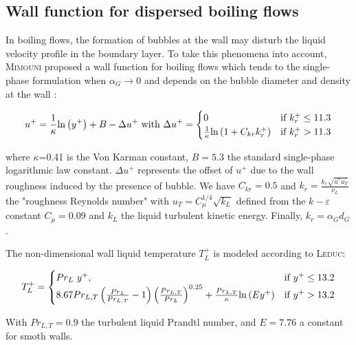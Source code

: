 \subsection{Wall function for dispersed boiling flows}
\label{subsec:wall_func}

In boiling flows, the formation of bubbles at the wall may disturb the liquid velocity profile in the boundary layer. To take this phenomena into account, \textsc{Mimouni} \etal\cite{Mimouni2016} proposed a wall function for boiling flows which tends to the single-phase formulation when $\alpha_{G} \rightarrow 0$ and depends on the bubble diameter and density at the wall : 

\begin{equation}
\label{eq:wall_law}
u^{+}=\frac{1}{\kappa}\ln{ y^{+} } + B - \Delta u^{+} \text{ with } 
  \Delta u^{+}=\begin{cases}
    0 & \text{if $k_{r}^{+}\leq11.3$}\\
    \frac{1}{\kappa}\ln{ 1+ C_{kr}k_{r}^{+} } & \text{\text{if $k_{r}^{+}>11.3$}}
  \end{cases}
\end{equation}

where $\kappa$=0.41 is the Von Karman constant, $B=5.3$ the standard single-phase logarithmic law constant. $\Delta u^{+}$ represents the offset of $u^{+}$ due to the wall roughness induced by the presence of bubble. We have $C_{kr}=0.5$ and $k_{r}=\displaystyle \frac{k_{r}\sqrt{u^{*}u_{T}}}{\nu_{L}}$ the "roughness Reynolds number" with $u_{T}=C_{\mu}^{1/4}\sqrt{k_{L}}$ defined from the $k-\varepsilon$ constant $C_{\mu}=0.09$ and $k_{L}$ the liquid turbulent kinetic energy. Finally, $k_{r}=\alpha_{G}d_{G}$.

The non-dimensional wall liquid temperature $T_{L}^{+}$ is modeled according to \textsc{Leduc}\cite{Leduc1995}:

\begin{equation}
\label{eq:wall_law} 
  T_{L}^{+}=\begin{cases}
    Pr_{L}~y^{+}, & \text{if $y^{+}\leq 13.2$}\\
    8.67Pr_{L,T}\parth{ \frac{Pr_{L}}{Pr_{L,T}}-1 } \parth{\frac{Pr_{L,T}}{Pr_{L}} }^{0.25} + \frac{Pr_{L,T}}{\kappa}\ln{Ey^{+}}  & \text{\text{if $y^{+}>13.2$}}
  \end{cases}
\end{equation}

With $Pr_{L,T}=0.9$ the turbulent liquid Prandtl number, and $E=7.76$ a constant for smoth walls.